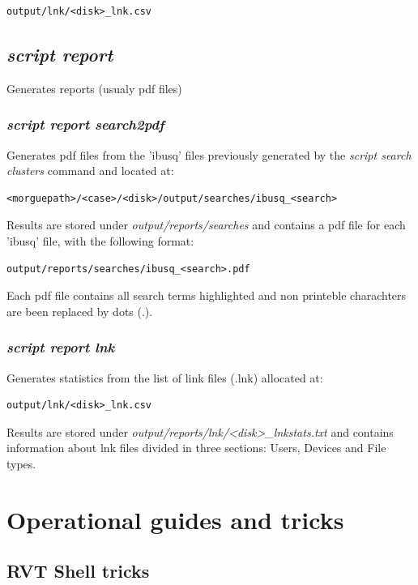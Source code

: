 \documentclass[a4paper,11pt,oneside]{report}
\begin{document}
\begin{verbatim}
output/lnk/<disk>_lnk.csv
\end{verbatim}


\section{\emph{script report}}

Generates reports (usualy pdf files)

\subsection{\emph{script report search2pdf}} 

Generates pdf files from the 'ibusq' files previously generated by the  \emph{script search clusters} command and located at:

\begin{verbatim}
<morguepath>/<case>/<disk>/output/searches/ibusq_<search>
\end{verbatim}

Results are stored under \emph{output/reports/searches} and contains a pdf file for each 'ibusq' file, with the following format:

\begin{verbatim}
output/reports/searches/ibusq_<search>.pdf
\end{verbatim}

Each pdf file contains all search terms highlighted and non printeble charachters are been replaced by dots (.).

\subsection{\emph{script report lnk}}

Generates statistics from the list of link files (.lnk) allocated at:
\begin{verbatim}
output/lnk/<disk>_lnk.csv
\end{verbatim}

Results are stored under \emph{output/reports/lnk/<disk>\_lnkstats.txt} and contains information about lnk files divided in three sections: Users, Devices and File types.
\chapter{Operational guides and tricks}



\section{RVT Shell tricks}
\end{document}
